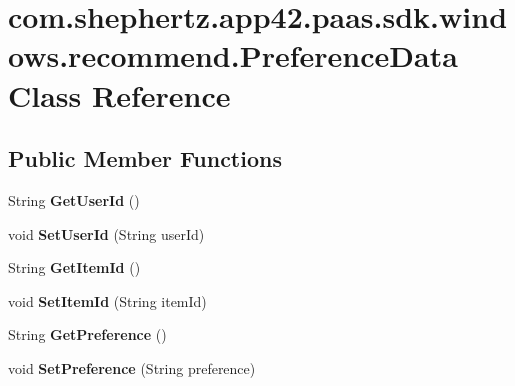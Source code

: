 \hypertarget{classcom_1_1shephertz_1_1app42_1_1paas_1_1sdk_1_1windows_1_1recommend_1_1_preference_data}{\section{com.\+shephertz.\+app42.\+paas.\+sdk.\+windows.\+recommend.\+Preference\+Data Class Reference}
\label{classcom_1_1shephertz_1_1app42_1_1paas_1_1sdk_1_1windows_1_1recommend_1_1_preference_data}
}
\subsection*{Public Member Functions}
\begin{DoxyCompactItemize}
\item 
\hypertarget{classcom_1_1shephertz_1_1app42_1_1paas_1_1sdk_1_1windows_1_1recommend_1_1_preference_data_af8452b591a1ffa233dfb33011c547275}{String {\bfseries Get\+User\+Id} ()}\label{classcom_1_1shephertz_1_1app42_1_1paas_1_1sdk_1_1windows_1_1recommend_1_1_preference_data_af8452b591a1ffa233dfb33011c547275}

\item 
\hypertarget{classcom_1_1shephertz_1_1app42_1_1paas_1_1sdk_1_1windows_1_1recommend_1_1_preference_data_a3ea24485a4473f2aa5ec41517b6578e7}{void {\bfseries Set\+User\+Id} (String user\+Id)}\label{classcom_1_1shephertz_1_1app42_1_1paas_1_1sdk_1_1windows_1_1recommend_1_1_preference_data_a3ea24485a4473f2aa5ec41517b6578e7}

\item 
\hypertarget{classcom_1_1shephertz_1_1app42_1_1paas_1_1sdk_1_1windows_1_1recommend_1_1_preference_data_a16962e64d18d60f3ef37f60dcedd9662}{String {\bfseries Get\+Item\+Id} ()}\label{classcom_1_1shephertz_1_1app42_1_1paas_1_1sdk_1_1windows_1_1recommend_1_1_preference_data_a16962e64d18d60f3ef37f60dcedd9662}

\item 
\hypertarget{classcom_1_1shephertz_1_1app42_1_1paas_1_1sdk_1_1windows_1_1recommend_1_1_preference_data_afc7d834f06f62d0f3899aaf2dd352d0a}{void {\bfseries Set\+Item\+Id} (String item\+Id)}\label{classcom_1_1shephertz_1_1app42_1_1paas_1_1sdk_1_1windows_1_1recommend_1_1_preference_data_afc7d834f06f62d0f3899aaf2dd352d0a}

\item 
\hypertarget{classcom_1_1shephertz_1_1app42_1_1paas_1_1sdk_1_1windows_1_1recommend_1_1_preference_data_af32c1ec8c499dd485928a965b8781fdc}{String {\bfseries Get\+Preference} ()}\label{classcom_1_1shephertz_1_1app42_1_1paas_1_1sdk_1_1windows_1_1recommend_1_1_preference_data_af32c1ec8c499dd485928a965b8781fdc}

\item 
\hypertarget{classcom_1_1shephertz_1_1app42_1_1paas_1_1sdk_1_1windows_1_1recommend_1_1_preference_data_a8bd3df88523542ea26d28b38df0a41ab}{void {\bfseries Set\+Preference} (String preference)}\label{classcom_1_1shephertz_1_1app42_1_1paas_1_1sdk_1_1windows_1_1recommend_1_1_preference_data_a8bd3df88523542ea26d28b38df0a41ab}

\end{DoxyCompactItemize}
